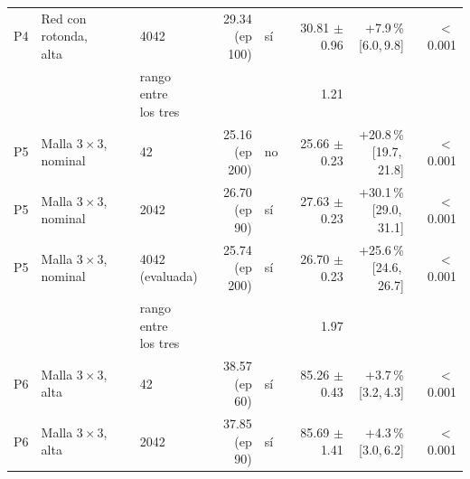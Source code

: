 \begin{table}[H]
\begin{tabular}{lllrlrrr}
P4 & \makecell[l]{Red con rotonda,\\{}alta} & 4042 & \makecell[r]{29.34\\{}(ep 100)} & sí & \makecell[r]{30.81\\{}$\pm$ 0.96} & \makecell[r]{+7.9\,\%\\{}[6.0,\,9.8]} & $<$\,0.001 \\
 & & \makecell[l]{rango entre\\{}los tres} & & & 1.21 & & \\
P5 & \makecell[l]{Malla $3 \times 3$,\\{}nominal} & 42 & \makecell[r]{25.16\\{}(ep 200)} & no & \makecell[r]{25.66\\{}$\pm$ 0.23} & \makecell[r]{+20.8\,\%\\{}[19.7,\,21.8]} & $<$\,0.001 \\
P5 & \makecell[l]{Malla $3 \times 3$,\\{}nominal} & 2042 & \makecell[r]{26.70\\{}(ep 90)} & sí & \makecell[r]{27.63\\{}$\pm$ 0.23} & \makecell[r]{+30.1\,\%\\{}[29.0,\,31.1]} & $<$\,0.001 \\
P5 & \makecell[l]{Malla $3 \times 3$,\\{}nominal} & \makecell[l]{4042\\{}(evaluada)} & \makecell[r]{25.74\\{}(ep 200)} & sí & \makecell[r]{26.70\\{}$\pm$ 0.23} & \makecell[r]{+25.6\,\%\\{}[24.6,\,26.7]} & $<$\,0.001 \\
 & & \makecell[l]{rango entre\\{}los tres} & & & 1.97 & & \\
P6 & \makecell[l]{Malla $3 \times 3$,\\{}alta} & 42 & \makecell[r]{38.57\\{}(ep 60)} & sí & \makecell[r]{85.26\\{}$\pm$ 0.43} & \makecell[r]{+3.7\,\%\\{}[3.2,\,4.3]} & $<$\,0.001 \\
P6 & \makecell[l]{Malla $3 \times 3$,\\{}alta} & 2042 & \makecell[r]{37.85\\{}(ep 90)} & sí & \makecell[r]{85.69\\{}$\pm$ 1.41} & \makecell[r]{+4.3\,\%\\{}[3.0,\,6.2]} & $<$\,0.001 \\

\end{tabular}
\end{table}
